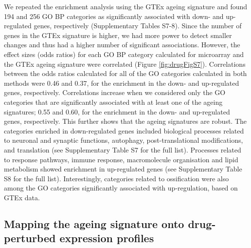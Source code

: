 \documentclass[12pt,twoside]{unicam}
\begin{document}
We repeated the enrichment analysis using the GTEx ageing signature and found 194 and 256 GO BP categories as significantly associated with down- and up-regulated genes, respectively (Supplementary Tables S7-8). Since the number of genes in the GTEx signature is higher, we had more power to detect smaller changes and thus had a higher number of significant associations. However, the effect sizes (odds ratios) for each GO BP category calculated for microarray and the GTEx ageing signature were correlated (Figure \ref{fig:drugFigS7}). Correlations between the odds ratios calculated for all of the GO categories calculated in both methods were 0.46 and 0.37, for the enrichment in the down- and up-regulated genes, respectively. Correlations increase when we considered only the GO categories that are significantly associated with at least one of the ageing signatures; 0.55 and 0.60, for the enrichment in the down- and up-regulated genes, respectively. This further shows that the ageing signatures are robust. The categories enriched in down-regulated genes included biological processes related to neuronal and synaptic functions, autophagy, post-translational modifications, and translation (see Supplementary Table S7 for the full list). Processes related to response pathways, immune response, macromolecule organisation and lipid metabolism showed enrichment in up-regulated genes (see Supplementary Table S8 for the full list). Interestingly, categories related to ossification were also among the GO categories significantly associated with up-regulation, based on GTEx data.

\hypertarget{mapping-the-ageing-signature-onto-drug-perturbed-expression-profiles}{%
\subsection{Mapping the ageing signature onto drug-perturbed expression profiles}\label{mapping-the-ageing-signature-onto-drug-perturbed-expression-profiles}}
\end{document}
